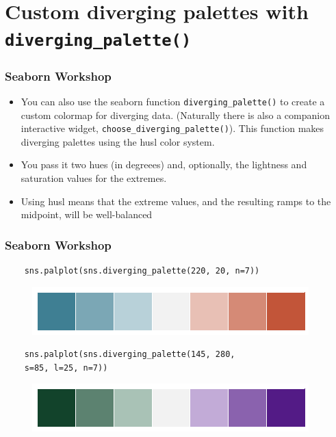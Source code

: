 \documentclass{beamer}
\begin{document}
\section{Custom diverging palettes with \texttt{diverging\_palette()}}
\begin{frame}[fragile]
	\frametitle{Seaborn Workshop}
	\large
	
	\begin{itemize}
		\item You can also use the seaborn function \texttt{diverging\_palette()} to create a custom colormap for diverging data. (Naturally there is also a companion interactive widget, \texttt{choose\_diverging\_palette()}). This function makes diverging palettes using the husl color system. 
		\item You pass it two hues (in degreees) and, optionally, the lightness and saturation values for the extremes. 
		\item Using husl means that the extreme values, and the resulting ramps to the midpoint, will be well-balanced
		
	\end{itemize}
\end{frame}
\begin{frame}[fragile]
	\frametitle{Seaborn Workshop}
	\large
	\begin{verbatim}
	sns.palplot(sns.diverging_palette(220, 20, n=7))
	\end{verbatim}
	
	\begin{figure}
		\centering
		\includegraphics[width=0.7\linewidth]{images/color_palettes_59_0}
	\end{figure}
	
	
	
	\begin{verbatim}
	sns.palplot(sns.diverging_palette(145, 280, 
	s=85, l=25, n=7))
	\end{verbatim}
	
	\begin{figure}
		\centering
		\includegraphics[width=0.7\linewidth]{images/color_palettes_60_0}
	\end{figure}
\end{frame}
\end{document}
